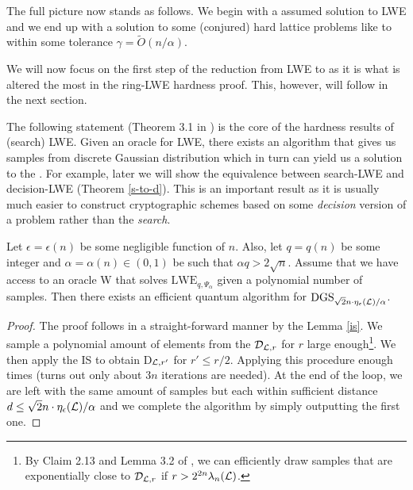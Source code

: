 The full picture now stands as follows. We begin with a assumed solution to LWE and we end up with a solution to some (conjured) hard lattice problems like  to within some tolerance $\gamma = \tilde{O}(n/\alpha)$.

\begin{center}
\end{center}
We will now focus on the first step of the reduction from LWE to  as it is what is altered the most in the ring-LWE hardness proof. This, however, will follow in the next section.

The following statement (Theorem 3.1 in \cite{regev}) is the core of the hardness results of (search) LWE. Given an oracle for LWE, there exists an algorithm that gives us samples from discrete Gaussian distribution which in turn can yield us a solution to the . For example, later we will show the equivalence between search-LWE and decision-LWE (Theorem \ref{s-to-d}). This is an important result as it is usually much easier to construct cryptographic schemes based on some \textit{decision} version of a problem rather than the \textit{search}.

\begin{theorem}\label{heart}
	Let $\epsilon = \epsilon(n)$ be some negligible function of $n$. Also, let $q = q(n)$ be some integer and $\alpha = \alpha(n) \in (0, 1)$ be such that $\alpha q > 2\sqrt{n}$. Assume that we have access to an oracle W that solves $\text{LWE}_{q,\Psi_{\alpha}}$ given a polynomial number of samples. Then there exists an efficient quantum algorithm for $\text{DGS}_{\sqrt{2}n \cdot \eta_{\epsilon}(\mathcal{L})/\alpha}$.
\end{theorem}
\begin{proof}
	The proof follows in a straight-forward manner by the Lemma \ref{is}. We sample a polynomial amount of elements from the $\mathcal{D}_{\mathcal{L}, r}$ for $r$ large enough\footnote{By Claim 2.13 and Lemma 3.2 of \cite{regev}, we can efficiently draw samples that are exponentially close to $\mathcal{D}_{\mathcal{L}, r}$ if $r > 2^{2n} \lambda_n(\mathcal{L})$.}. We then apply the IS to obtain D$_{\mathcal{L}, r'}$ for $r' \leq r/2$. Applying this procedure enough times (turns out only about $3n$ iterations are needed). At the end of the loop, we are left with the same amount of samples but each within sufficient distance $d \leq \sqrt{2}n \cdot \eta_{\epsilon}(\mathcal{L})/\alpha$ and we complete the algorithm by simply outputting the first one.
\end{proof}

